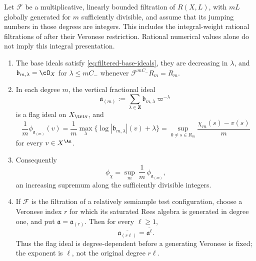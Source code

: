 \begin{proposition}\label{prop:ch33-base-ideal-flag}
Let $\mathcal F$ be a multiplicative, linearly bounded filtration of
$R(X,L)$, with $mL$ globally generated for $m$ sufficiently
divisible, and assume that its jumping numbers in those degrees are
integers.  This includes the integral-weight rational filtrations of
 after their Veronese restriction.
Rational numerical values alone do not imply this integral presentation.
\begin{enumerate}
\item The base ideals satisfy \eqref{eq:filtered-base-ideals}, they are
 decreasing in $\lambda$, and $\mathfrak b_{m,\lambda}=\cO_X$ for
 $\lambda\leq mC_-$ whenever
 $\mathcal F^{mC_-}R_m=R_m$.
\item In each degree $m$, the vertical fractional ideal
\begin{equation}
\label{eq:ch33-degree-m-flag}
 \mathfrak a_{(m)}
 :=\sum_{\lambda\in\mathbf Z}\mathfrak b_{m,\lambda}\varpi^{-\lambda}
\end{equation}
 is a flag ideal on $X_{\triv}$, and
\begin{equation}
\label{eq:ch33-flag-vs-norm}
 \frac1m\phi_{\mathfrak a_{(m)}}(v)
 =\frac1m\max_{\lambda}\bigl\{\log|\mathfrak b_{m,\lambda}|(v)+\lambda\bigr\}
 =\sup_{0\ne s\in R_m}\frac{\chi_m(s)-v(s)}{m}
\end{equation}
 for every $v\in X^{\An}$.
\item Consequently
\begin{equation}
\label{eq:ch33-phi-sup-of-flags}
 \phi_\chi=\sup_{m}\ \frac1m\,\phi_{\mathfrak a_{(m)}},
\end{equation}
 an increasing supremum along the sufficiently divisible integers.
\item If $\mathcal F$ is the filtration of a relatively semiample test
 configuration, choose a Veronese index $r$ for which its saturated Rees
 algebra is generated in degree one, and put
 $\mathfrak a=\mathfrak a_{(r)}$.  Then for every $\ell\geq1$,
 \begin{equation}
 \label{eq:ch33-flag-power-propagation}
  \overline{\mathfrak a_{(r\ell)}}
  =\overline{\mathfrak a^{\ell}} .
 \end{equation}
 Thus the flag ideal is degree-dependent before a generating Veronese is
 fixed; the exponent is $\ell$, not the original degree $r\ell$.
\end{enumerate}
\end{proposition}

